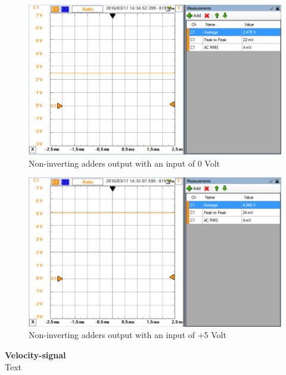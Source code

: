 \begin{figure}[H]
	\centering
	\includegraphics[width=0.9\linewidth]{Hardware/SignalConverter/Torque_test2}
	\caption{Non-inverting adders output with an input of 0 Volt}
	\label{fig:TorqueTest2}
\end{figure}

\begin{figure}[H]
	\centering
	\includegraphics[width=0.9\linewidth]{Hardware/SignalConverter/Torque_test3}
	\caption{Non-inverting adders output with an input of +5 Volt}
	\label{fig:TorqueTest3}
\end{figure}

\textbf{Velocity-signal}\\
Text 